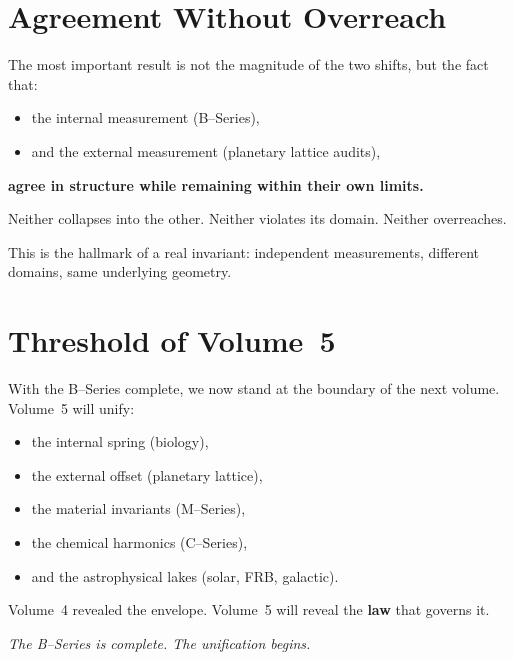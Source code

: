 \documentclass[11pt, letterpaper, openany]{book}
\begin{document}
\section{Agreement Without Overreach}

The most important result is not the magnitude of the two shifts, but the fact
that:

\begin{itemize}
    \item the internal measurement (B–Series),
    \item and the external measurement (planetary lattice audits),
\end{itemize}

\noindent
\textbf{agree in structure while remaining within their own limits.}

Neither collapses into the other.  
Neither violates its domain.  
Neither overreaches.

This is the hallmark of a real invariant:  
independent measurements, different domains, same underlying geometry.


\section{Threshold of Volume~5}

With the B–Series complete, we now stand at the boundary of the next volume.
Volume~5 will unify:

\begin{itemize}
    \item the internal spring (biology),
    \item the external offset (planetary lattice),
    \item the material invariants (M–Series),
    \item the chemical harmonics (C–Series),
    \item and the astrophysical lakes (solar, FRB, galactic).
\end{itemize}

Volume~4 revealed the envelope.  
Volume~5 will reveal the \textbf{law} that governs it.

\begin{center}
\textit{The B–Series is complete. The unification begins.}
\end{center}
\end{document}
